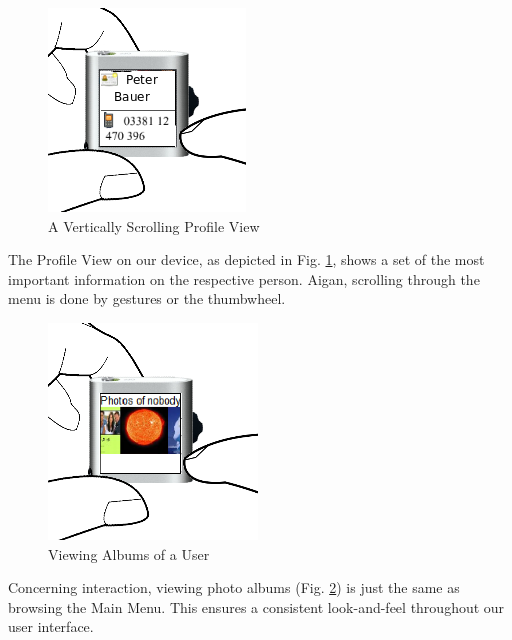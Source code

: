 \begin{figure}[h]
  \begin{center}
    \includegraphics[width=0.6\linewidth]{imgs/wt4.png}
  \end{center}
  \caption{A Vertically Scrolling Profile View}
  \label{fig:wt4}
\end{figure}
%
The Profile View on our device, as depicted in Fig. \ref{fig:wt4}, shows a set of the most important information on the respective person. Aigan, scrolling through the menu is done by gestures or the thumbwheel.\\
%
\begin{figure}[h!]
  \begin{center}
    \includegraphics[width=0.6\linewidth]{imgs/wt5.png}
  \end{center}
  \caption{Viewing Albums of a User}
  \label{fig:wt5}
\end{figure}
%
Concerning interaction, viewing photo albums (Fig. \ref{fig:wt5}) is just the same as browsing the Main Menu. This ensures a consistent look-and-feel throughout our user interface.


